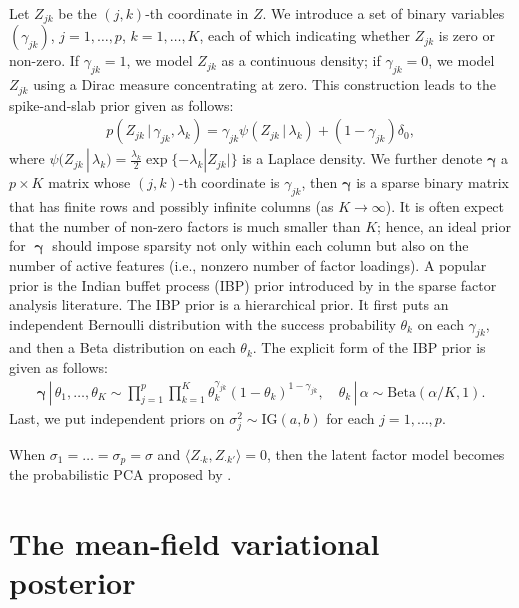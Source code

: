 \documentclass[pdftex]{imsart}
\DeclareMathOperator*{\bgamma}{\boldsymbol{\gamma}}
\newcommand{\given}{\,|\,}
\theoremstyle{plain}
\begin{document}
Let $Z_{jk}$ be the $(j,k)$-th coordinate in $Z$. We introduce a set of binary variables $(\gamma_{jk})$, $j = 1, \dots, p$, $k = 1, \dots, K$, each of which indicating whether $Z_{jk}$ is zero or non-zero. If $\gamma_{jk} = 1$, we model $Z_{jk}$ as a continuous density; if $\gamma_{jk} = 0$, we model $Z_{jk}$ using a Dirac measure concentrating at zero. This construction leads to the spike-and-slab prior given as follows:
\begin{align}
\label{prior-Z}
p(Z_{jk} \given \gamma_{jk}, \lambda_k) = \gamma_{jk} \psi(Z_{jk} \given \lambda_k) + (1 - \gamma_{jk}) \delta_0,
\end{align}
where $\psi(Z_{jk} \given \lambda_k) = \frac{\lambda_k}{2} \exp\{- \lambda_k|Z_{jk}|\}$ is a Laplace density. 
We further denote $\boldsymbol \gamma$ a $p \times K$ matrix whose $(j, k)$-th coordinate is $\gamma_{jk}$, then $\boldsymbol \gamma$ is a sparse binary matrix that has finite rows and possibly infinite columns (as $K \to \infty$). It is often expect that the number of non-zero factors is much smaller than $K$; hence, an ideal prior for $\bgamma$ should impose sparsity not only within each column but also on the number of active features (i.e., nonzero number of factor loadings). A popular prior is the Indian buffet process (IBP) prior
introduced by \citet{knowles11} in the sparse factor analysis literature.
The IBP prior is a hierarchical prior. It first puts an independent Bernoulli distribution with the success probability $\theta_k$ on each $\gamma_{jk}$, and then a Beta distribution on each $\theta_k$. 
The explicit form of the IBP prior is given as follows:
\begin{align}
\label{ibp}
\boldsymbol \gamma \given \theta_1, \dots, \theta_K \sim \prod_{j=1}^p \prod_{k=1}^K \theta_k^{\gamma_{jk}} (1-\theta_k)^{1-\gamma_{jk}},
\quad 
\theta_k \given \alpha \sim \text{Beta}(\alpha/K, 1).
\end{align}
Last, we put independent priors on $\sigma_j^2 \sim \text{IG}(a, b)$ for each $j =1, \dots, p$.

When $\sigma_1 = \dots = \sigma_p = \sigma$ and $\langle Z_{\cdot k }, Z_{\cdot k'} \rangle = 0$, then the latent factor model becomes the probabilistic PCA proposed by \citet{tipping99}.


\section{The mean-field variational posterior}
\end{document}

